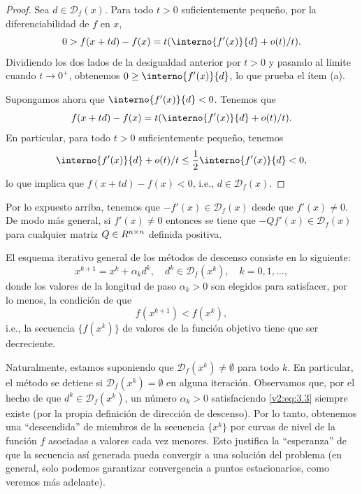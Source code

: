 \begin{proof}
    Sea $d \in \mathcal{D}_f(x)$. Para todo $t > 0$ suficientemente pequeño, por la diferenciabilidad de $f$ en $x$,
    \[
        0 > f(x + td) - f(x) = t(\interno{f'(x)}{d} + o(t)/t).
    \]
    Dividiendo los dos lados de la desigualdad anterior por $t > 0$ y pasando al límite cuando $t \to 0^+$, obtenemos $0 \ge \interno{f'(x)}{d}$, lo que prueba el ítem (a).
    
    Supongamos ahora que $\interno{f'(x)}{d} < 0$. Tenemos que
    \[
        f(x + td) - f(x) = t(\interno{f'(x)}{d} + o(t)/t).
    \]
    En particular, para todo $t > 0$ suficientemente pequeño, tenemos
    \[
        \interno{f'(x)}{d} + o(t)/t \le \frac{1}{2} \interno{f'(x)}{d} < 0,
    \]
    lo que implica que $f(x + td) - f(x) < 0$, i.e., $d \in \mathcal{D}_f(x)$.
\end{proof}

Por lo expuesto arriba, tenemos que $-f'(x) \in \mathcal{D}_f(x)$ desde que $f'(x) \neq 0$. De modo más general, si $f'(x) \neq 0$ entonces se tiene que $-Qf'(x) \in \mathcal{D}_f(x)$ para cualquier matriz $Q \in R^{n \times n}$ definida positiva.

El esquema iterativo general de los métodos de descenso consiste en lo siguiente:
\begin{equation}
    x^{k+1} = x^k + \alpha_k d^k, \quad d^k \in \mathcal{D}_f(x^k), \quad k=0, 1, \dots,
    \label{v2:eq:3.2}
\end{equation}
donde los valores de la longitud de paso $\alpha_k > 0$ son elegidos para satisfacer, por lo menos, la condición de que
\begin{equation}
    f(x^{k+1}) < f(x^k),
    \label{v2:eq:3.3}
\end{equation}
i.e., la secuencia $\{f(x^k)\}$ de valores de la función objetivo tiene que ser decreciente.

Naturalmente, estamos suponiendo que $\mathcal{D}_f(x^k) \neq \emptyset$ para todo $k$. En particular, el método se detiene si $\mathcal{D}_f(x^k) = \emptyset$ en alguna iteración. Observamos que, por el hecho de que $d^k \in \mathcal{D}_f(x^k)$, un número $\alpha_k > 0$ satisfaciendo \eqref{v2:eq:3.3} siempre existe (por la propia definición de dirección de descenso). Por lo tanto, obtenemos una ``descendida'' de miembros de la secuencia $\{x^k\}$ por curvas de nivel de la función $f$ asociadas a valores cada vez menores. Esto justifica la ``esperanza'' de que la secuencia así generada pueda convergir a una solución del problema (en general, solo podemos garantizar convergencia a puntos estacionarios, como veremos más adelante).

